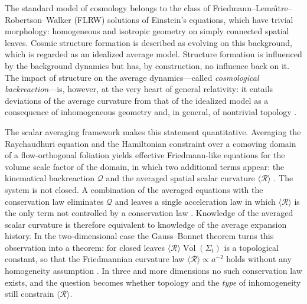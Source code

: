 \documentclass[aps,prd,reprint,amsmath,amssymb,nofootinbib,longbibliography]{revtex4-2}
\DeclareMathOperator{\Vol}{Vol}
\newcommand{\Rs}{\mathcal{R}}               %
\theoremstyle{plain}
\theoremstyle{definition}
\theoremstyle{remark}
\begin{document}
The standard model of cosmology belongs to the class of Friedmann--Lema\^{\i}tre--Robertson--Walker (FLRW) solutions of Einstein's equations, which have trivial morphology: homogeneous and isotropic geometry on simply connected spatial leaves. Cosmic structure formation is described as evolving on this background, which is regarded as an idealized average model. Structure formation is influenced by the background dynamics but has, by construction, no influence back on it. The impact of structure on the average dynamics---called \textit{cosmological backreaction}---is, however, at the very heart of general relativity: it entails deviations of the average curvature from that of the idealized model as a consequence of inhomogeneous geometry and, in general, of nontrivial topology \cite{Buchert_2007}.

The scalar averaging framework makes this statement quantitative. Averaging the Raychaudhuri equation and the Hamiltonian constraint over a comoving domain of a flow-orthogonal foliation yields effective Friedmann-like equations for the volume scale factor of the domain, in which two additional terms appear: the kinematical backreaction $\mathcal{Q}$ and the averaged spatial scalar curvature $\langle \Rs \rangle$ \cite{Buchert_2007}. The system is not closed. A combination of the averaged equations with the conservation law eliminates $\mathcal{Q}$ and leaves a single acceleration law in which $\langle \Rs\rangle$ is the only term not controlled by a conservation law \cite{brunswic2020gaussbonnetchern}. Knowledge of the averaged scalar curvature is therefore equivalent to knowledge of the average expansion history. In the two-dimensional case the Gauss--Bonnet theorem turns this observation into a theorem: for closed leaves $\langle\Rs\rangle\Vol(\Sigma_t)$ is a topological constant, so that the Friedmannian curvature law $\langle\Rs\rangle\propto a^{-2}$ holds without any homogeneity assumption \cite{brunswic2020gaussbonnetchern}. In three and more dimensions no such conservation law exists, and the question becomes whether topology and the \emph{type} of inhomogeneity still constrain $\langle\Rs\rangle$.
\end{document}
